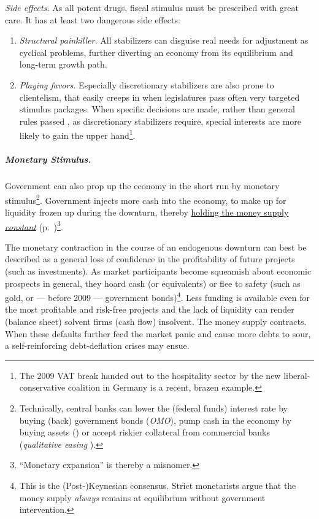 \emph{Side effects.} As all potent drugs, fiscal stimulus must be prescribed with great care. It has at least two dangerous side effects:
\begin{enumerate}
	\item \emph{Structural painkiller.} All stabilizers can disguise real needs for adjustment as cyclical problems, further diverting an economy from its equilibrium and long-term growth path.
	\item \emph{Playing favors.} Especially discretionary stabilizers are also prone to clientelism, that easily creeps in when legislatures pass often very targeted stimulus packages. When specific decisions are made, rather than general rules passed \citep{Weber-1918-aa}, as discretionary stabilizers require, special interests are more likely to gain the upper hand\footnote{
		The 2009 VAT break handed out to the hospitality sector by the new liberal-conservative coalition in Germany is a recent, brazen example.}.
\end{enumerate}

\subparagraph{Monetary Stimulus.}  \label{sec:monetary-stimulus}
Government can also prop up the economy in the short run by monetary stimulus\footnote{
	Technically, central banks can lower the (federal funds) interest rate by buying (back) government bonds (\emph{\gls{OMO}}), pump cash in the economy by buying assets () or accept riskier collateral from commercial banks (\emph{qualitative easing} \citep{Buiter2008}).}.
Government injects more cash into the economy, to make up for liquidity frozen up during the downturn, thereby \hyperref[sec:price-stability]{holding the money supply \emph{constant}} (p.~\pageref{sec:price-stability})\footnote{
	``Monetary expansion'' is thereby a misnomer.}.

The monetary contraction in the course of an endogenous downturn can best be described as a general loss of confidence in the profitability of future projects (such as investments). As market participants become squeamish about economic prospects in general, they hoard cash (or equivalents) or flee to safety (such as gold, or --- before 2009 --- government bonds)\footnote{
	This is the (Post-)Keynesian consensus. Strict monetarists argue that the money supply \emph{always} remains at equilibrium without government intervention.}.
Less funding is available even for the most profitable and risk-free projects and the lack of liquidity can render (balance sheet) solvent firms (cash flow) insolvent. The money supply contracts. When these defaults further feed the market panic and cause more debts to sour, a self-reinforcing debt-deflation crises may ensue. %

